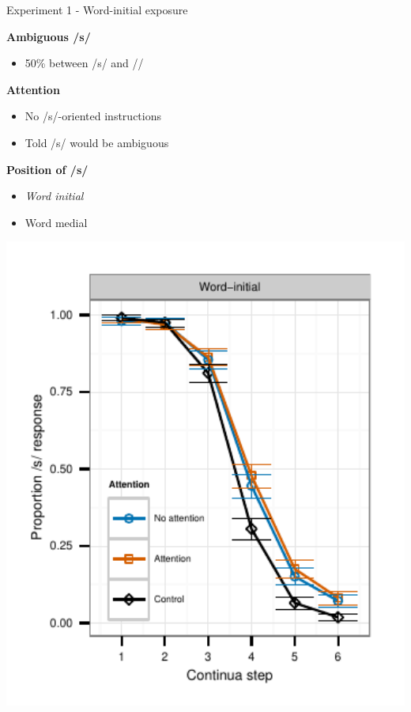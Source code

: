 \documentclass{beamer}
\begin{document}
\begin{frame}{Experiment 1 - Word-initial exposure}

\begin{minipage}{0.4\textwidth}
\textbf{Ambiguous /s/}
\begin{itemize}
\item 50\% between /s/ and /\textesh/
\end{itemize}

\textbf{Attention}
\begin{itemize}
\item No /s/-oriented instructions
\item Told /s/ would be ambiguous
\end{itemize}

\textbf{Position of /s/}
\begin{itemize}
\item \emph{Word initial}
\item Word medial
\end{itemize}
\end{minipage}
\hfill
\begin{minipage}{0.53\textwidth}
\includegraphics[width=1.0\textwidth]{graphs/exp1_categresults_present2-initial}
\end{minipage}

\end{frame}
\end{document}
